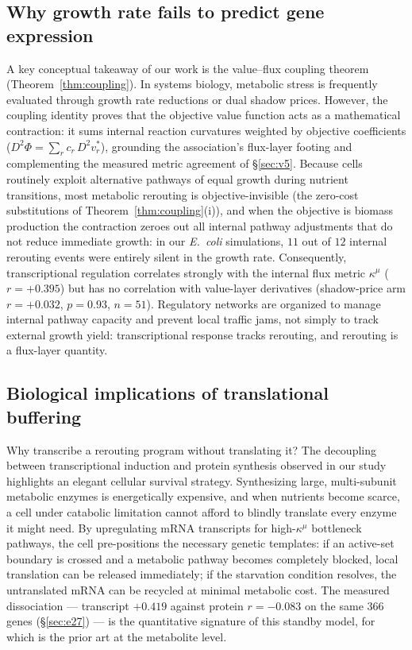 \documentclass[11pt,a4paper]{article}
\theoremstyle{plain}
\theoremstyle{definition}
\theoremstyle{remark}
\newcommand{\kmu}{\kappa^{\mu}}
\begin{document}
\subsection{Why growth rate fails to predict gene expression}
A key conceptual takeaway of our work is the value--flux coupling
theorem (Theorem~\ref{thm:coupling}). In systems biology, metabolic
stress is frequently evaluated through growth rate reductions or dual
shadow prices. However, the coupling identity proves that the
objective value function acts as a mathematical contraction: it sums
internal reaction curvatures weighted by objective coefficients
($D^2\Phi = \sum_r c_r\, D^2 v^*_r$), grounding the association's
flux-layer footing and complementing the measured metric agreement
of \S\ref{sec:v5}. Because cells routinely exploit alternative
pathways of equal growth during nutrient transitions, most metabolic
rerouting is objective-invisible (the zero-cost substitutions of
Theorem~\ref{thm:coupling}(i)), and when the objective is biomass
production the contraction zeroes out all internal pathway
adjustments that do not reduce immediate growth: in our
\emph{E.~coli} simulations, $11$ out of $12$ internal rerouting
events were entirely silent in the growth rate. Consequently,
transcriptional regulation correlates strongly with the internal
flux metric $\kmu$ ($r = +0.395$) but has no correlation with
value-layer derivatives (shadow-price arm $r = +0.032$, $p = 0.93$,
$n = 51$). Regulatory networks are organized to manage internal
pathway capacity and prevent local traffic jams, not simply to track
external growth yield: transcriptional response tracks rerouting,
and rerouting is a flux-layer quantity.

\subsection{Biological implications of translational buffering}
Why transcribe a rerouting program without translating it? The
decoupling between transcriptional induction and protein synthesis
observed in our study highlights an elegant cellular survival
strategy. Synthesizing large, multi-subunit metabolic enzymes is
energetically expensive, and when nutrients become scarce, a cell
under catabolic limitation cannot afford to blindly translate every
enzyme it might need. By upregulating mRNA transcripts for
high-$\kmu$ bottleneck pathways, the cell pre-positions the
necessary genetic templates: if an active-set boundary is crossed and
a metabolic pathway becomes completely blocked, local translation
can be released immediately; if the starvation condition resolves,
the untranslated mRNA can be recycled at minimal metabolic cost. The
measured dissociation --- transcript $+0.419$ against protein
$r = -0.083$ on the same $366$ genes (\S\ref{sec:e27}) --- is the
quantitative signature of this standby model, for which
\citet{kochanowski2013} is the prior art at the metabolite level.
\end{document}
